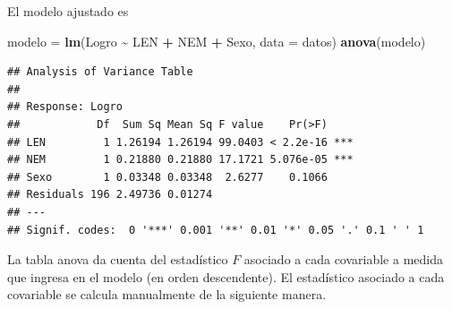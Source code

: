 \documentclass[
  11pt,
]{book}
\newenvironment{Shaded}{\begin{snugshade}}{\end{snugshade}}
\newcommand{\AttributeTok}[1]{\textcolor[rgb]{0.13,0.29,0.53}{#1}}
\newcommand{\FunctionTok}[1]{\textcolor[rgb]{0.13,0.29,0.53}{\textbf{#1}}}
\newcommand{\NormalTok}[1]{#1}
\newcommand{\OtherTok}[1]{\textcolor[rgb]{0.56,0.35,0.01}{#1}}
\newcommand{\SpecialCharTok}[1]{\textcolor[rgb]{0.81,0.36,0.00}{\textbf{#1}}}
\theoremstyle{definition}
\theoremstyle{definition}
\theoremstyle{definition}
\theoremstyle{definition}
\theoremstyle{remark}
\begin{document}
El modelo ajustado es

\begin{Shaded}
\begin{Highlighting}[]
\NormalTok{modelo }\OtherTok{=} \FunctionTok{lm}\NormalTok{(Logro }\SpecialCharTok{\textasciitilde{}}\NormalTok{ LEN }\SpecialCharTok{+}\NormalTok{ NEM }\SpecialCharTok{+}\NormalTok{ Sexo, }\AttributeTok{data =}\NormalTok{ datos)}
\FunctionTok{anova}\NormalTok{(modelo)}
\end{Highlighting}
\end{Shaded}

\begin{verbatim}
## Analysis of Variance Table
## 
## Response: Logro
##            Df  Sum Sq Mean Sq F value    Pr(>F)    
## LEN         1 1.26194 1.26194 99.0403 < 2.2e-16 ***
## NEM         1 0.21880 0.21880 17.1721 5.076e-05 ***
## Sexo        1 0.03348 0.03348  2.6277    0.1066    
## Residuals 196 2.49736 0.01274                      
## ---
## Signif. codes:  0 '***' 0.001 '**' 0.01 '*' 0.05 '.' 0.1 ' ' 1
\end{verbatim}

La tabla anova da cuenta del estadístico \(F\) asociado a cada covariable a medida que ingresa en el modelo (en orden descendente). El estadístico asociado a cada covariable se calcula manualmente de la siguiente manera.
\end{document}
